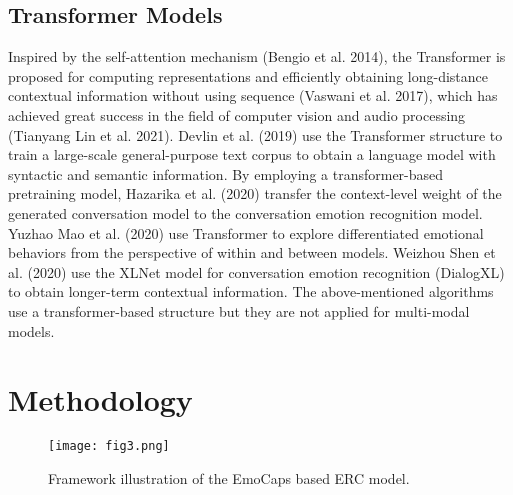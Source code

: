 \subsection{Transformer Models}
Inspired by the self-attention mechanism (Bengio et al. 2014), the Transformer is proposed for computing representations and efficiently obtaining long-distance contextual information without using sequence (Vaswani et al. 2017), which has achieved great success in the field of computer vision and audio processing (Tianyang Lin et al. 2021). Devlin et al. (2019) use the Transformer structure to train a large-scale general-purpose text corpus to obtain a language model with syntactic and semantic information. By employing a transformer-based pretraining model, Hazarika et al. (2020) transfer the context-level weight of the generated conversation model to the conversation emotion recognition model. Yuzhao Mao et al. (2020) use Transformer to explore differentiated emotional behaviors from the perspective of within and between models. Weizhou Shen et al. (2020) use the XLNet model for conversation emotion recognition (DialogXL) to obtain longer-term contextual information. The above-mentioned algorithms use a transformer-based structure but they are not applied for multi-modal models.
\section{Methodology}
\begin{figure*}[t]
	\centering
	\texttt{[image: fig3.png]} %
	\caption{Framework illustration of the EmoCaps based ERC model.}
	\label{fig3}
\end{figure*}
